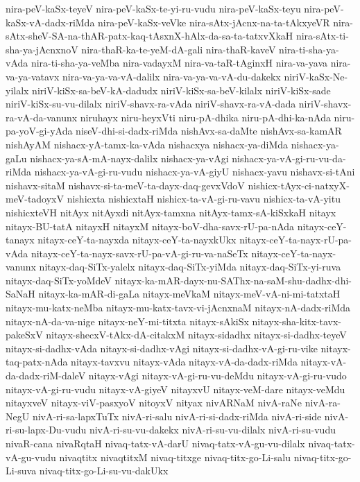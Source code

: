 {nira-peV-kaSx-teyeV
nira-peV-kaSx-te-yi-ru-vudu
nira-peV-kaSx-teyu
nira-peV-kaSx-vA-dadx-riMda
nira-peV-kaSx-veVke
nira-sAtx-jAcnx-na-ta-tAkxyeVR
nira-sAtx-sheV-SA-na-thAR-patx-kaq-tAsxnX-hAlx-da-sa-ta-tatxvXkaH
nira-sAtx-ti-sha-ya-jAcnxnoV
nira-thaR-ka-te-yeM-dA-gali
nira-thaR-kaveV
nira-ti-sha-ya-vAda
nira-ti-sha-ya-veMba
nira-vadayxM
nira-va-taR-tAginxH
nira-va-yava
nira-va-ya-vatavx
nira-va-ya-va-vA-dalilx
nira-va-ya-va-vA-du-dakekx
niriV-kaSx-Ne-yilalx
niriV-kiSx-sa-beV-kA-dadudx
niriV-kiSx-sa-beV-kilalx
niriV-kiSx-sade
niriV-kiSx-su-vu-dilalx
niriV-shavx-ra-vAda
niriV-shavx-ra-vA-dada
niriV-shavx-ra-vA-da-vanunx
niruhayx
niru-heyxVti
niru-pA-dhika
niru-pA-dhi-ka-nAda
niru-pa-yoV-gi-yAda
niseV-dhi-si-dadx-riMda
nishAvx-sa-daMte
nishAvx-sa-kamAR
nishAyAM
nishacx-yA-tamx-ka-vAda
nishacxya
nishacx-ya-diMda
nishacx-ya-gaLu
nishacx-ya-sA-mA-nayx-dalilx
nishacx-ya-vAgi
nishacx-ya-vA-gi-ru-vu-da-riMda
nishacx-ya-vA-gi-ru-vudu
nishacx-ya-vA-giyU
nishacx-yavu
nishavx-si-tAni
nishavx-sitaM
nishavx-si-ta-meV-ta-dayx-daq-gevxVdoV
nishicx-tAyx-ci-natxyX-meV-tadoyxV
nishicxta
nishicxtaH
nishicx-ta-vA-gi-ru-vavu
nishicx-ta-vA-yitu
nishicxteVH
nitAyx
nitAyxdi
nitAyx-tamxna
nitAyx-tamx-sA-kiSxkaH
nitayx
nitayx-BU-tatA
nitayxH
nitayxM
nitayx-boV-dha-savx-rU-pa-nAda
nitayx-ceY-tanayx
nitayx-ceY-ta-nayxda
nitayx-ceY-ta-nayxkUkx
nitayx-ceY-ta-nayx-rU-pa-vAda
nitayx-ceY-ta-nayx-savx-rU-pa-vA-gi-ru-va-naSeTx
nitayx-ceY-ta-nayx-vanunx
nitayx-daq-SiTx-yalelx
nitayx-daq-SiTx-yiMda
nitayx-daq-SiTx-yi-ruva
nitayx-daq-SiTx-yoMdeV
nitayx-ka-mAR-dayx-nu-SAThx-na-saM-shu-dadhx-dhi-SaNaH
nitayx-ka-mAR-di-gaLa
nitayx-meVkaM
nitayx-meV-vA-ni-mi-tatxtaH
nitayx-mu-katx-neMba
nitayx-mu-katx-tavx-vi-jAcnxnaM
nitayx-nA-dadx-riMda
nitayx-nA-da-va-nige
nitayx-neY-mi-titxta
nitayx-sAkiSx
nitayx-sha-kitx-tavx-pakeSxV
nitayx-shecxV-tAkx-dA-citakxM
nitayx-sidadhx
nitayx-si-dadhx-teyeV
nitayx-si-dadhx-vAda
nitayx-si-dadhx-vAgi
nitayx-si-dadhx-vA-gi-ru-vike
nitayx-taq-patx-nAda
nitayx-tavxvu
nitayx-vAda
nitayx-vA-da-dadx-riMda
nitayx-vA-da-dadx-riM-daleV
nitayx-vAgi
nitayx-vA-gi-ru-vu-deMdu
nitayx-vA-gi-ru-vudo
nitayx-vA-gi-ru-vudu
nitayx-vA-giyeV
nitayxvU
nitayx-veM-dare
nitayx-veMdu
nitayxveV
nitayx-viV-pasxyoV
nitoyxV
nityax
nivARNaM
nivA-raNe
nivA-ra-NegU
nivA-ri-sa-lapxTuTx
nivA-ri-salu
nivA-ri-si-dadx-riMda
nivA-ri-side
nivA-ri-su-lapx-Du-vudu
nivA-ri-su-vu-dakekx
nivA-ri-su-vu-dilalx
nivA-ri-su-vudu
nivaR-cana
nivaRqtaH
nivaq-tatx-vA-darU
nivaq-tatx-vA-gu-vu-dilalx
nivaq-tatx-vA-gu-vudu
nivaqtitx
nivaqtitxM
nivaq-titxge
nivaq-titx-go-Li-salu
nivaq-titx-go-Li-suva
nivaq-titx-go-Li-su-vu-dakUkx
}
